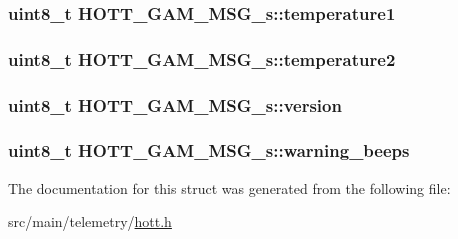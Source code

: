 \hypertarget{structHOTT__GAM__MSG__s_ab16ec09f213e4dd719048a972fefa8ee}{
\subsubsection[{temperature1}]{\setlength{\rightskip}{0pt plus 5cm}uint8\+\_\+t H\+O\+T\+T\+\_\+\+G\+A\+M\+\_\+\+M\+S\+G\+\_\+s\+::temperature1}}\label{structHOTT__GAM__MSG__s_ab16ec09f213e4dd719048a972fefa8ee}
\hypertarget{structHOTT__GAM__MSG__s_ae72237e6410df90fe73670194c78ace7}{
\subsubsection[{temperature2}]{\setlength{\rightskip}{0pt plus 5cm}uint8\+\_\+t H\+O\+T\+T\+\_\+\+G\+A\+M\+\_\+\+M\+S\+G\+\_\+s\+::temperature2}}\label{structHOTT__GAM__MSG__s_ae72237e6410df90fe73670194c78ace7}
\hypertarget{structHOTT__GAM__MSG__s_a94c8789e70b59d6decfedeb63d83c20d}{
\subsubsection[{version}]{\setlength{\rightskip}{0pt plus 5cm}uint8\+\_\+t H\+O\+T\+T\+\_\+\+G\+A\+M\+\_\+\+M\+S\+G\+\_\+s\+::version}}\label{structHOTT__GAM__MSG__s_a94c8789e70b59d6decfedeb63d83c20d}
\hypertarget{structHOTT__GAM__MSG__s_a0c1a86d48ead98a7eaf5bdd38eedc6dc}{
\subsubsection[{warning\+\_\+beeps}]{\setlength{\rightskip}{0pt plus 5cm}uint8\+\_\+t H\+O\+T\+T\+\_\+\+G\+A\+M\+\_\+\+M\+S\+G\+\_\+s\+::warning\+\_\+beeps}}\label{structHOTT__GAM__MSG__s_a0c1a86d48ead98a7eaf5bdd38eedc6dc}


The documentation for this struct was generated from the following file\+:\begin{DoxyCompactItemize}
\item 
src/main/telemetry/\hyperlink{telemetry_2hott_8h}{hott.\+h}\end{DoxyCompactItemize}
